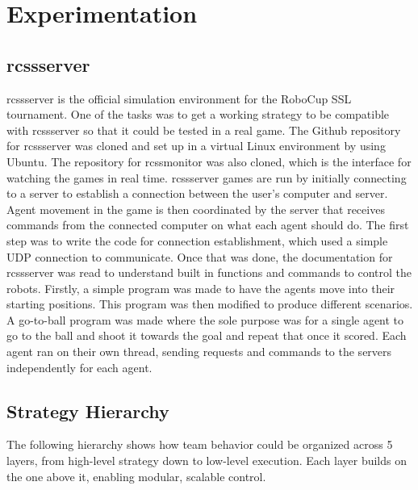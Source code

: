 \section{Experimentation}

\subsection{rcssserver}
rcssserver is the official simulation environment for the RoboCup SSL tournament. One of the tasks was to get a working strategy to be compatible with rcssserver so that it could be tested in a real game. The Github repository for rcssserver was cloned and set up in a virtual Linux environment by using Ubuntu. The repository for rcssmonitor was also cloned, which is the interface for watching the games in real time. rcssserver games are run by initially connecting to a server to establish a connection between the user's computer and server. Agent movement in the game is then coordinated by the server that receives commands from the connected computer on what each agent should do. The first step was to write the code for connection establishment, which used a simple UDP connection to communicate. Once that was done, the documentation for rcssserver was read to understand built in functions and commands to control the robots. Firstly, a simple program was made to have the agents move into their starting positions. This program was then modified to produce different scenarios. A go-to-ball program was made where the sole purpose was for a single agent to go to the ball and shoot it towards the goal and repeat that once it scored. Each agent ran on their own thread, sending requests and commands to the servers independently for each agent.

\subsection{Strategy Hierarchy}
The following hierarchy shows how team behavior could be organized across 5 layers, from high-level strategy down to low-level execution. Each layer builds on the one above it, enabling modular, scalable control.

